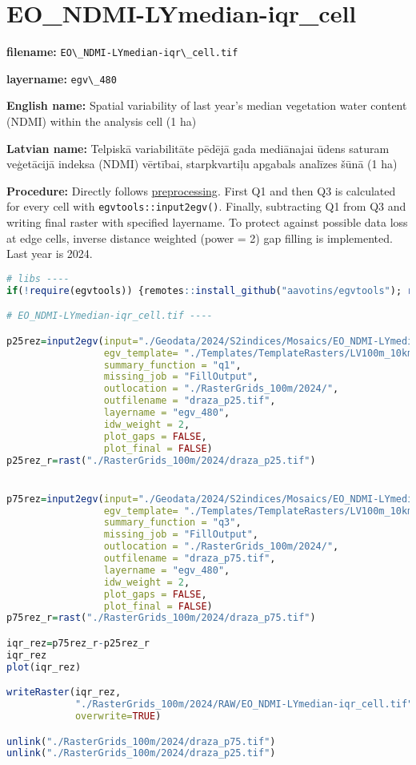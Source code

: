 \documentclass[
]{book}
\newcommand{\passthrough}[1]{#1}
\begin{document}
\section{EO\_NDMI-LYmedian-iqr\_cell}\label{ch06.480}

\textbf{filename:} \passthrough{\lstinline!EO\_NDMI-LYmedian-iqr\_cell.tif!}

\textbf{layername:} \passthrough{\lstinline!egv\_480!}

\textbf{English name:} Spatial variability of last year's median vegetation water content (NDMI) within the analysis cell (1 ha)

\textbf{Latvian name:} Telpiskā variabilitāte pēdējā gada mediānajai ūdens saturam veģetācijā indeksa (NDMI) vērtībai, starpkvartiļu apgabals analīzes šūnā (1 ha)

\textbf{Procedure:} Directly follows \hyperref[Ch04.13]{preprocessing}. First Q1 and then Q3
is calculated for every cell with \passthrough{\lstinline!egvtools::input2egv()!}. Finally, subtracting
Q1 from Q3 and writing final raster with specified layername. To protect against possible data loss at edge cells,
inverse distance weighted (power = 2) gap filling is implemented. Last year is 2024.

\begin{lstlisting}[language=R]
# libs ----
if(!require(egvtools)) {remotes::install_github("aavotins/egvtools"); require(egvtools)}

# EO_NDMI-LYmedian-iqr_cell.tif ----

p25rez=input2egv(input="./Geodata/2024/S2indices/Mosaics/EO_NDMI-LYmedian.tif",
                 egv_template= "./Templates/TemplateRasters/LV100m_10km.tif",
                 summary_function = "q1",
                 missing_job = "FillOutput",
                 outlocation = "./RasterGrids_100m/2024/",
                 outfilename = "draza_p25.tif",
                 layername = "egv_480",
                 idw_weight = 2,
                 plot_gaps = FALSE,
                 plot_final = FALSE)
p25rez_r=rast("./RasterGrids_100m/2024/draza_p25.tif")


p75rez=input2egv(input="./Geodata/2024/S2indices/Mosaics/EO_NDMI-LYmedian.tif",
                 egv_template= "./Templates/TemplateRasters/LV100m_10km.tif",
                 summary_function = "q3",
                 missing_job = "FillOutput",
                 outlocation = "./RasterGrids_100m/2024/",
                 outfilename = "draza_p75.tif",
                 layername = "egv_480",
                 idw_weight = 2,
                 plot_gaps = FALSE,
                 plot_final = FALSE)
p75rez_r=rast("./RasterGrids_100m/2024/draza_p75.tif")

iqr_rez=p75rez_r-p25rez_r
iqr_rez
plot(iqr_rez)

writeRaster(iqr_rez,
            "./RasterGrids_100m/2024/RAW/EO_NDMI-LYmedian-iqr_cell.tif",
            overwrite=TRUE)

unlink("./RasterGrids_100m/2024/draza_p75.tif")
unlink("./RasterGrids_100m/2024/draza_p25.tif")
\end{lstlisting}
\end{document}
